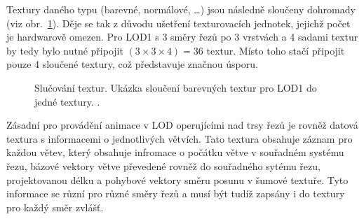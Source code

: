 Textury daného typu (barevné, normálové, \dots) jsou následně sloučeny dohromady (viz obr.~\ref{fig:joinTextures}). Děje se tak z důvodu ušetření texturovacích jednotek, jejichž počet je hardwarově omezen. Pro LOD1 s 3 směry řezů po 3 vrstvách a 4 sadami textur by tedy bylo nutné připojit $ (3 \times 3 \times 4 ) = 36 $ textur. Místo toho stačí připojit pouze 4 sloučené textury, což představuje značnou úsporu.
%
\begin{figure}[!hbt]
\begin{center}
\end{center}
\caption[Slučování textur]%
{Slučování textur. Ukázka sloučení barevných textur pro LOD1 do jedné textury. .\label{fig:joinTextures}
}
\end{figure}

\pagebreak

Zásadní pro provádění animace v LOD operujícími nad trsy řezů je rovněž datová textura s informacemi o jednotlivých větvích. Tato textura obsahuje záznam pro každou větev, který obsahuje infromace o počátku větve v souřadném systému řezu, bázové vektory větve převedené rovněž do souřadného sytému řezu, projektovanou délku a pohybové vektory směru posunu v šumové textuře. Tyto informace se různí pro různé směry řezů a musí být tudíž zapsány i do textury pro každý směr zvlášť.


